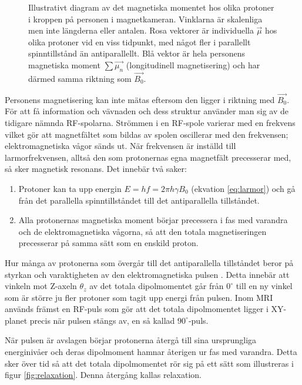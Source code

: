 \documentclass[11pt, a4paper]{article}
\begin{document}
\begin{figure}[ht]
	\centering
	
	\caption{Illustrativt diagram av det magnetiska momentet hos olika protoner i kroppen på personen i magnetkameran. Vinklarna är skalenliga men inte längderna eller antalen. Rosa vektorer är individuella $\vec{\mu}$ hos olika protoner vid en viss tidpunkt, med något fler i parallellt spinntillstånd än antiparallellt. Blå vektor är hela personens magnetiska moment $\sum{\vec{\mu_n}}$ (longitudinell magnetisering) och har därmed samma riktning som $\vec{B_0}$.}
	\label{fig:spinn_vektorer}
\end{figure}

Personens magnetisering kan inte mätas eftersom den ligger i riktning med $\vec{B_0}$. För att få information och vävnaden och dess struktur använder man sig av de tidigare nämnda RF-spolarna. Strömmen i en RF-spole varierar med en frekvens vilket gör att magnetfältet som bildas av spolen oscillerar med den frekvensen; elektromagnetiska vågor sänds ut. När frekvensen är inställd till larmorfrekvensen, alltså den som protonernas egna magnetfält precesserar med, så sker magnetisk resonans. Det innebär två saker:
\begin{enumerate}
	\item Protoner kan ta upp energin $E=hf=2\pi h\gamma B_0$ (ekvation \ref{eq:larmor}) och gå från det parallella spinntillståndet till det antiparallella tillståndet.
	\item Alla protonernas magnetiska moment börjar precessera i fas med varandra och de elektromagnetiska vågorna, så att den totala magnetiseringen precesserar på samma sätt som en enskild proton.
\end{enumerate}

Hur många av protonerna som övergår till det antiparallella tillståndet beror på styrkan och varaktigheten av den elektromagnetiska pulsen \parencite{mri_for_radiologists}. Detta innebär att vinkeln mot Z-axeln $\theta_z$ av det totala dipolmomentet går från $0^\circ$ till en ny vinkel som är större ju fler protoner som tagit upp energi från pulsen. Inom MRI används främst en RF-puls som gör att det totala dipolmomentet ligger i XY-planet precis när pulsen stängs av, en så kallad $90^\circ$-puls. 

När pulsen är avslagen börjar protonerna återgå till sina ursprungliga energinivåer och deras dipolmoment hamnar återigen ur fas med varandra. Detta sker över tid så att det totala dipolmomentet rör sig på ett sätt som illustreras i figur \ref{fig:relaxation}. Denna återgång kallas relaxation.
\end{document}

